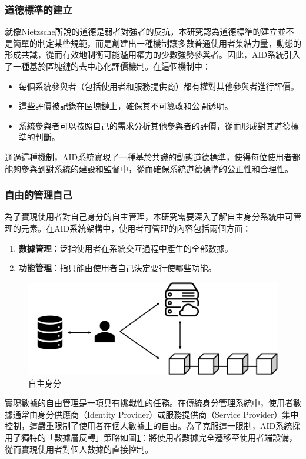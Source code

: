 \subsubsection{道德標準的建立}
就像Nietzsche所說的道德是弱者對強者的反抗，本研究認為道德標準的建立並不是簡單的制定某些規範，而是創建出一種機制讓多數普通使用者集結力量，動態的形成共識，從而有效地制衡可能濫用權力的少數強勢參與者。因此，AID系統引入了一種基於區塊鏈的去中心化評價機制。在這個機制中：
\begin{itemize}
  \item 每個系統參與者（包括使用者和服務提供商）都有權對其他參與者進行評價。
  \item 這些評價被記錄在區塊鏈上，確保其不可篡改和公開透明。
  \item 系統參與者可以按照自己的需求分析其他參與者的評價，從而形成對其道德標準的判斷。
\end{itemize}
通過這種機制，AID系統實現了一種基於共識的動態道德標準，使得每位使用者都能夠參與到對系統的建設和監督中，從而確保系統道德標準的公正性和合理性。
\subsubsection{自由的管理自己}
為了實現使用者對自己身分的自主管理，本研究需要深入了解自主身分系統中可管理的元素。在AID系統架構中，使用者可管理的內容包括兩個方面：
\begin{enumerate}
  \item \textbf{數據管理}：泛指使用者在系統交互過程中產生的全部數據。
  \item \textbf{功能管理}：指只能由使用者自己決定要行使哪些功能。
\end{enumerate}
\begin{figure}
  \centering
  \includegraphics[width=\linewidth,keepaspectratio]{figures/aid.png}
  \caption{自主身分}
  \label{fig:aid}
\end{figure}
實現數據的自由管理是一項具有挑戰性的任務。在傳統身分管理系統中，使用者數據通常由身分供應商（Identity Provider）或服務提供商（Service Provider）集中控制，這嚴重限制了使用者在個人數據上的自由。為了克服這一限制，AID系統採用了獨特的「數據層反轉」策略如圖\ref{fig:aid}：將使用者數據完全遷移至使用者端設備，從而實現使用者對個人數據的直接控制。

